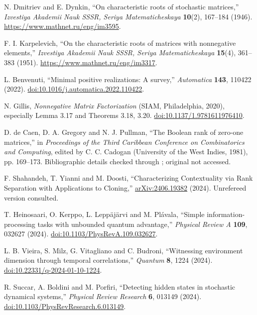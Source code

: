 N. Dmitriev and E. Dynkin,
``On characteristic roots of stochastic matrices,''
\emph{Izvestiya Akademii Nauk SSSR, Seriya Matematicheskaya}
\textbf{10}(2), 167--184 (1946).
\url{https://www.mathnet.ru/eng/im3595}.

F. I. Karpelevich,
``On the characteristic roots of matrices with nonnegative elements,''
\emph{Izvestiya Akademii Nauk SSSR, Seriya Matematicheskaya}
\textbf{15}(4), 361--383 (1951).
\url{https://www.mathnet.ru/eng/im3317}.

L. Benvenuti, ``Minimal positive realizations: A survey,''
\emph{Automatica} \textbf{143}, 110422 (2022).
\href{https://doi.org/10.1016/j.automatica.2022.110422}{doi:10.1016/j.automatica.2022.110422}.

N. Gillis, \emph{Nonnegative Matrix Factorization}
(SIAM, Philadelphia, 2020), especially Lemma 3.17 and Theorems 3.18, 3.20.
\href{https://doi.org/10.1137/1.9781611976410}{doi:10.1137/1.9781611976410}.

D. de Caen, D. A. Gregory and N. J. Pullman,
``The Boolean rank of zero-one matrices,'' in
\emph{Proceedings of the Third Caribbean Conference on Combinatorics and Computing},
edited by C. C. Cadogan (University of the West Indies, 1981), pp. 169--173.
Bibliographic details checked through \cite{rfGillis2020}; original not accessed.

F. Shahandeh, T. Yianni and M. Doosti,
``Characterizing Contextuality via Rank Separation with Applications to Cloning,''
\href{https://arxiv.org/abs/2406.19382}{arXiv:2406.19382} (2024).
Unrefereed version consulted.

T. Heinosaari, O. Kerppo, L. Lepp\"aj\"arvi and M. Pl\'avala,
``Simple information-processing tasks with unbounded quantum advantage,''
\emph{Physical Review A} \textbf{109}, 032627 (2024).
\href{https://doi.org/10.1103/PhysRevA.109.032627}{doi:10.1103/PhysRevA.109.032627}.

L. B. Vieira, S. Milz, G. Vitagliano and C. Budroni,
``Witnessing environment dimension through temporal correlations,''
\emph{Quantum} \textbf{8}, 1224 (2024).
\href{https://doi.org/10.22331/q-2024-01-10-1224}{doi:10.22331/q-2024-01-10-1224}.

R. Succar, A. Boldini and M. Porfiri,
``Detecting hidden states in stochastic dynamical systems,''
\emph{Physical Review Research} \textbf{6}, 013149 (2024).
\href{https://doi.org/10.1103/PhysRevResearch.6.013149}{doi:10.1103/PhysRevResearch.6.013149}.

